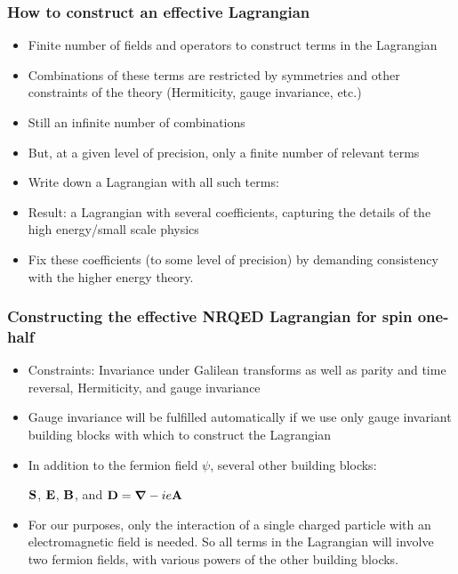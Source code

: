 \documentclass[11ppt]{beamer}
\begin{document}
\begin{frame}
\frametitle{How to construct an effective Lagrangian}
\begin{itemize}
\item 	Finite number of fields and operators to construct terms in the Lagrangian
\item 	Combinations of these terms are restricted by symmetries and other constraints of the theory (Hermiticity, gauge invariance, etc.)
\item 	Still an infinite number of combinations
\item 	But, at a given level of precision, only a finite number of relevant terms
\item 	Write down a Lagrangian with all such terms: 
\item	Result: a Lagrangian with several coefficients, capturing the details of the high energy/small scale physics
\item 	Fix these coefficients (to some level of precision) by demanding consistency with the higher energy theory.
\end{itemize}
\end{frame}

\begin{frame}
\frametitle{Constructing the effective NRQED Lagrangian for spin one-half}
\begin{itemize}
  
\item	Constraints: Invariance under Galilean transforms as well as parity and time reversal, Hermiticity, and gauge invariance
\item Gauge invariance will be fulfilled automatically if we use only gauge invariant building blocks with which to construct the Lagrangian
\item In addition to the fermion field $\psi$, several other building blocks:
\begin{center}
	$\mathbf{S}$, $\mathbf{E}$, $\mathbf{B}$, and $\v{D} = \v{\grad} - ie\v{A}$
\end{center}
\item  For our purposes, only the interaction of a single charged particle with an electromagnetic field is needed.  So all terms in the Lagrangian will involve two fermion fields, with various powers of the other building blocks.
\end{itemize}
\end{frame}
\end{document}
